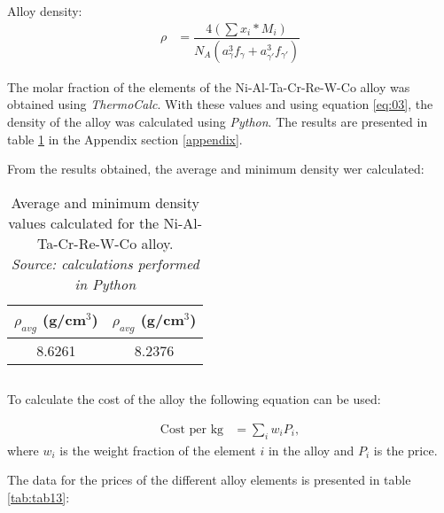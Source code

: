 \clearpage
\section{}

\subsection{}

Alloy density:
\begin{align}
    \label{eq:03}
    \rho &= \dfrac{4(\sum x_i * M_i)}{N_A\left(a_{\gamma}^3f_\gamma+a_{\gamma'}^3f_{\gamma'}\right)}
\end{align}

The molar fraction of the elements of the Ni-Al-Ta-Cr-Re-W-Co alloy was obtained using \textit{ThermoCalc}. With these values and using equation \ref{eq:03}, the density of the alloy was calculated using \textit{Python}. The results are presented in table \ref{tab:tab07} in the Appendix section \ref{appendix}.

From the results obtained, the average and minimum density wer calculated:

\begin{table}[h]
    \centering
    \begin{tabular}{cc}
        $\rho_{avg}$ (g/cm$^3$) & $\rho_{avg}$ (g/cm$^3$) \\ \hline \hline
        8.6261 & 8.2376
    \end{tabular}
    \caption{\centering Average and minimum density values calculated for the Ni-Al-Ta-Cr-Re-W-Co alloy.\\
    \textit{Source: calculations performed in Python \citep{mygit}}}
    \label{tab:tab07}
\end{table}

\subsection{}

To calculate the cost of the alloy the following equation can be used:

\begin{align}
    \text{Cost per kg} &= \sum_i w_i P_i,
    \label{eq:04}
\end{align}
where $w_i$ is the weight fraction of the element $i$ in the alloy and $P_i$ is the price.

The data for the prices of the different alloy elements is presented in table \ref{tab:tab13}:


